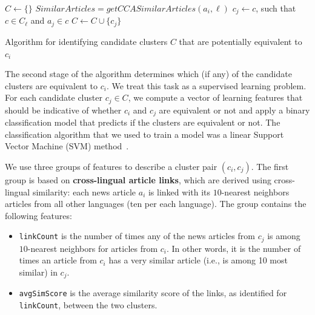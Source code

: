 \begin{algorithm}[t!]
$C \leftarrow \{\}$\;
 {
     {
        $SimilarArticles = getCCASimilarArticles(a_i, \ell)$\;
         {
            $c_j \leftarrow c$, such that $c \in C_\ell$ and $a_j \in c$\;
            $C \leftarrow C \cup \{ c_j \}$\;
        }
    }
}
\caption[Algorithm for identifying candidate clusters]{Algorithm for identifying candidate clusters $C$ that are potentially equivalent to $c_i$}
\label{cluster_merge_algo1}
\end{algorithm}

The second stage of the algorithm determines which (if any) of the candidate clusters are equivalent to $c_i$.
We treat this task as a supervised learning problem. For each candidate cluster $c_j \in C$, we compute
a vector of learning features that should be indicative of whether $c_i$ and $c_j$ are equivalent or not
and apply a binary classification model that predicts if the clusters are equivalent or not. The classification
algorithm that we used to train a model was a linear Support Vector Machine (SVM) method~\cite{shawe-taylor04kernel}.

We use three groups of features to describe a cluster pair $(c_i, c_j)$. The first group is based
on {\bf cross-lingual article links}, which are derived using cross-lingual similarity:
each news article $a_i$ is linked with its $10$-nearest neighbors articles from all other
languages (ten per each language). The group contains the following features:

\begin{itemize}
\item \texttt{linkCount} is the number of times any of the news articles from $c_j$ is among $10$-nearest neighbors for articles from $c_i$. In other words, it is the number of times an article from $c_i$ has a very similar article (i.e., is among 10 most similar) in $c_j$.
\item \texttt{avgSimScore} is the average similarity score of the links, as identified for \texttt{linkCount}, between the two clusters.
\end{itemize}

